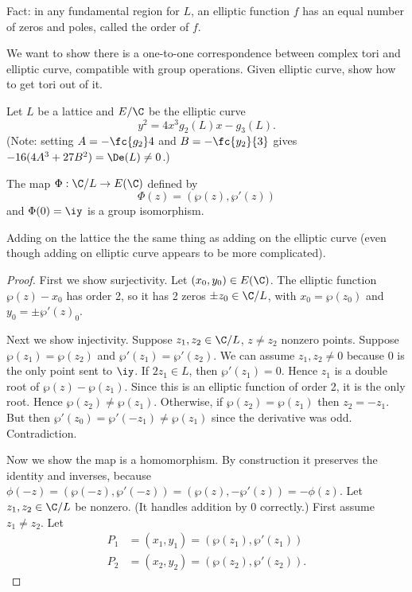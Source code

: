 Fact: in any fundamental region for $L$, an elliptic function $f$ has an equal number of zeros and poles, called the order of $f$.

We want to show there is a one-to-one correspondence between  complex tori and elliptic curve, compatible with group operations.
Given elliptic curve, show how to get tori out of it.

\begin{thm}
Let $L$ be a lattice and $E/\C$ be the elliptic curve
\[
y^2=4x^3g_2(L)x-g_3(L).
\]
(Note: setting $A=-\fc{g_2}4$ and $B=-\fc{y_2}{3}$ gives $-16(4A^3+27B^2)=\De(L)\ne 0$.)

The map $\Phi:\C/L\to E(\C)$ defined by 
\[\Phi(z)=(\wp(z),\wp'(z))\]
and $\Phi(0)=\iy$ is a group isomorphism.
\end{thm}
Adding on the lattice the the same thing as adding on the elliptic curve (even though adding on elliptic curve appears to be more complicated).
\begin{proof}
First we show surjectivity. Let $(x_0,y_0)\in E(\C)$. The elliptic function $\wp(z)-x_0$ has order 2, so it has 2 zeros $\pm z_0\in \C/L$, with $x_0=\wp(z_0)$ and $y_0=\pm\wp'(z)_0$.

Next we show injectivity. Suppose $z_1,z_2\in \C/L$, $z\ne z_2$ nonzero points. Suppose $\wp(z_1)=\wp(z_2)$ and $\wp'(z_1)=\wp'(z_2)$. We can assume $z_1,z_2\ne 0$ because 0 is the only point sent to $\iy$. If $2z_1\in L$, then $\wp'(z_1)=0$. Hence $z_1$ is a double root of $\wp(z)-\wp(z_1)$. Since this is an elliptic function of order 2, it is the only root. Hence $\wp(z_2)\ne \wp(z_1)$. Otherwise, if $\wp(z_2)=\wp(z_1)$ then $z_2=-z_1$. But then $\wp'(z_0)=\wp'(-z_1)\ne \wp(z_1)$ since the derivative was odd. Contradiction.

Now we show the map is a homomorphism. By construction it preserves the identity and inverses, because $\phi(-z)=(\wp(-z),\wp'(-z))=(\wp(z),-\wp'(z))=-\phi(z)$. Let $z_1,z_2\in \C/L$ be nonzero. (It handles addition by 0 correctly.) First assume $z_1\ne z_2$. Let 
\begin{align*}
P_1&=(x_1,y_1)=(\wp(z_1),\wp'(z_1))\\
P_2&=(x_2,y_2)=(\wp(z_2),\wp'(z_2)).
\end{align*}
\end{proof}
